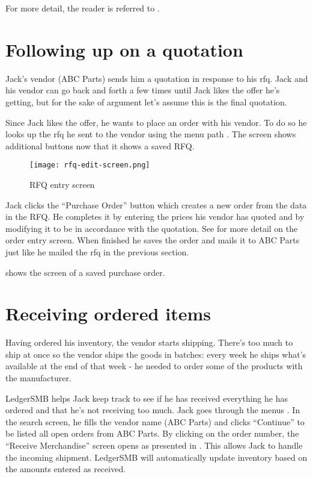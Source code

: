 For more detail, the reader is referred to .


\section{Following up on a quotation}

Jack's vendor (ABC Parts) sends him a quotation in response to his \gls{rfq}. Jack and his vendor
can go back and forth a few times until Jack likes the offer he's getting, but for the sake of
argument let's assume this is the final quotation.

Since Jack likes the offer, he wants to place an order with his vendor. To do so he looks up the
\gls{rfq} he sent to the vendor using the menu path .
The screen shows additional buttons now that it shows a saved RFQ.


\begin{figure}[h]
\centering
\texttt{[image: rfq-edit-screen.png]}
\caption{RFQ entry screen}
\label{fig:bus-rfq-edit-screen}
\end{figure}

Jack clicks the ``Purchase Order'' button which creates a new order from the data in the RFQ.
He completes it
by entering the prices his vendor has quoted and by modifying it to be in accordance with the
quotation. See  for more
detail on the order entry screen. When finished he saves the order and mails it to
ABC Parts just like he mailed the \gls{rfq} in the previous section.

 shows the screen of a saved purchase order.

\section{Receiving ordered items}

Having ordered his inventory, the vendor starts shipping. There's too much to ship at once
so the vendor ships the goods in batches: every week he ships what's available at the end
of that week - he needed to order some of the products with the manufacturer.

LedgerSMB helps Jack keep track to see if he has received everything he has ordered and
that he's not receiving too much. Jack goes through the menus .
In the search screen, he fills the vendor name (ABC Parts) and clicks ``Continue'' to be listed
all open orders from ABC Parts. By clicking on the order number, the ``Receive Merchandise'' screen
opens as presented in . This allows Jack to handle the incoming shipment. LedgerSMB will automatically update inventory
based on the amounts entered as received.

